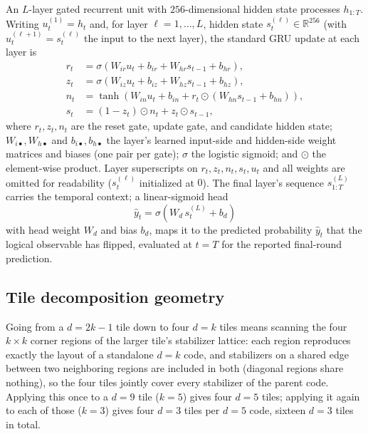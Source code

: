 \documentclass[aps,prxquantum,twocolumn,superscriptaddress,nofootinbib]{revtex4-2}
\begin{document}
An $L$-layer gated recurrent unit with $256$-dimensional hidden state processes $h_{1:T}$. Writing $u_t^{(1)} = h_t$ and, for layer $\ell = 1, \ldots, L$, hidden state $s_t^{(\ell)} \in \mathbb{R}^{256}$ (with $u_t^{(\ell+1)} = s_t^{(\ell)}$ the input to the next layer), the standard GRU update at each layer is
\begin{align}
r_t &= \sigma\!\left(W_{ir} u_t + b_{ir} + W_{hr} s_{t-1} + b_{hr}\right), \\
z_t &= \sigma\!\left(W_{iz} u_t + b_{iz} + W_{hz} s_{t-1} + b_{hz}\right), \\
n_t &= \tanh\!\left(W_{in} u_t + b_{in} + r_t \odot (W_{hn} s_{t-1} + b_{hn})\right), \\
s_t &= (1 - z_t) \odot n_t + z_t \odot s_{t-1},
\label{eq:gru}
\end{align}
where $r_t, z_t, n_t$ are the reset gate, update gate, and candidate hidden state; $W_{i\bullet}, W_{h\bullet}$ and $b_{i\bullet}, b_{h\bullet}$ the layer's learned input-side and hidden-side weight matrices and biases (one pair per gate); $\sigma$ the logistic sigmoid; and $\odot$ the element-wise product. Layer superscripts on $r_t, z_t, n_t, s_t, u_t$ and all weights are omitted for readability ($s_t^{(\ell)}$ initialized at $0$). The final layer's sequence $s_{1:T}^{(L)}$ carries the temporal context; a linear-sigmoid head
\begin{equation}
\hat{y}_t = \sigma\!\left(W_d\, s_t^{(L)} + b_d\right)
\label{eq:head}
\end{equation}
with head weight $W_d$ and bias $b_d$, maps it to the predicted probability $\hat y_t$ that the logical observable has flipped, evaluated at $t = T$ for the reported final-round prediction.

\subsection{Tile decomposition geometry}
\label{app:geometry}

Going from a $d=2k-1$ tile down to four $d=k$ tiles means scanning the four $k\times k$ corner regions of the larger tile's stabilizer lattice: each region reproduces exactly the layout of a standalone $d=k$ code, and stabilizers on a shared edge between two neighboring regions are included in both (diagonal regions share nothing), so the four tiles jointly cover every stabilizer of the parent code. Applying this once to a $d=9$ tile ($k=5$) gives four $d=5$ tiles; applying it again to each of those ($k=3$) gives four $d=3$ tiles per $d=5$ code, sixteen $d=3$ tiles in total.
\end{document}
